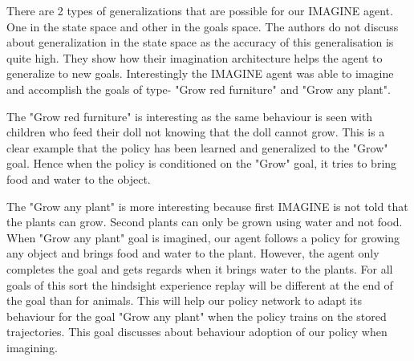 \documentclass[10pt]{article}
\begin{document}
There are 2 types of generalizations that are possible for our IMAGINE agent.
One in the state space and other in the goals space.
The authors do not discuss about generalization in the state space as the accuracy of this generalisation is quite high.
They show how their imagination architecture helps the agent to generalize to new goals.
Interestingly the IMAGINE agent was able to imagine and accomplish the goals of type- "Grow red furniture" and "Grow any plant".

The "Grow red furniture" is interesting as the same behaviour is seen with children who feed their doll not  knowing that the doll cannot grow.
This is a clear example that the policy has been learned and generalized to the "Grow" goal. Hence when the policy is conditioned on the "Grow" goal, it tries to bring food and water to the object. 

The "Grow any plant" is more interesting because first IMAGINE is not told that the plants can grow.
Second plants can only be grown using water and not food.
When "Grow any plant" goal is imagined, our agent follows a policy for growing any object and brings food and water to the plant.
However, the agent only completes the goal and gets regards when it brings water to the plants.
For all goals of this sort the hindsight experience replay will be different at the end of the goal than for animals.
This will help our policy network to adapt its behaviour for the goal "Grow any plant" when the policy trains on the stored trajectories.
This goal discusses about behaviour adoption of our policy when imagining.
\end{document}

